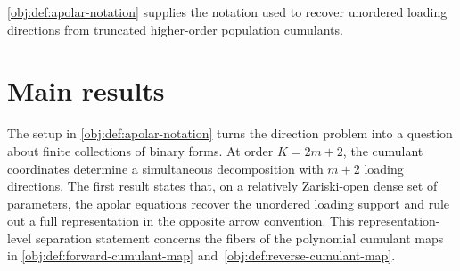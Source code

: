 \documentclass[11pt]{article}
\begin{document}
\cref{obj:def:apolar-notation} supplies the notation used to recover unordered loading directions from truncated higher-order population cumulants.


\section{Main results}

The setup in \cref{obj:def:apolar-notation} turns the direction problem into a question about finite collections of binary forms. At order \(K=2m+2\), the cumulant coordinates determine a simultaneous decomposition with \(m+2\) loading directions. The first result states that, on a relatively Zariski-open dense set of parameters, the apolar equations recover the unordered loading support and rule out a full representation in the opposite arrow convention. This representation-level separation statement concerns the fibers of the polynomial cumulant maps in \cref{obj:def:forward-cumulant-map} and~\cref{obj:def:reverse-cumulant-map}.
\end{document}
